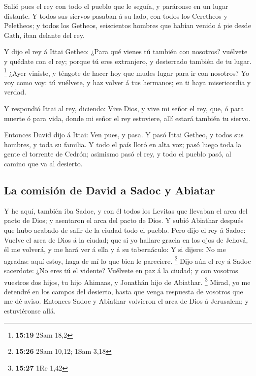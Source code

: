  Salió pues el rey con todo el pueblo que le seguía, y
paráronse en un lugar distante.  Y todos sus siervos
pasaban á su lado, con todos los Ceretheos y Peletheos; y todos los
Getheos, seiscientos hombres que habían venido á pie desde Gath, iban
delante del rey.

 Y dijo el rey á Ittai Getheo: ¿Para qué vienes tú también
con nosotros? vuélvete y quédate con el rey; porque tú eres extranjero,
y desterrado también de tu lugar. \footnote{\textbf{15:19} 2Sam 18,2}
 ¿Ayer viniste, y téngote de hacer hoy que mudes lugar para
ir con nosotros? Yo voy como voy: tú vuélvete, y haz volver á tus
hermanos; en ti haya misericordia y verdad.

 Y respondió Ittai al rey, diciendo: Vive Dios, y vive mi
señor el rey, que, ó para muerte ó para vida, donde mi señor el rey
estuviere, allí estará también tu siervo.

 Entonces David dijo á Ittai: Ven pues, y pasa. Y pasó
Ittai Getheo, y todos sus hombres, y toda su familia.  Y
todo el país lloró en alta voz; pasó luego toda la gente el torrente de
Cedrón; asimismo pasó el rey, y todo el pueblo pasó, al camino que va al
desierto.

\hypertarget{la-comisiuxf3n-de-david-a-sadoc-y-abiatar}{%
\subsection{La comisión de David a Sadoc y
Abiatar}\label{la-comisiuxf3n-de-david-a-sadoc-y-abiatar}}

 Y he aquí, también iba Sadoc, y con él todos los Levitas
que llevaban el arca del pacto de Dios; y asentaron el arca del pacto de
Dios. Y subió Abiathar después que hubo acabado de salir de la ciudad
todo el pueblo.  Pero dijo el rey á Sadoc: Vuelve el arca
de Dios á la ciudad; que si yo hallare gracia en los ojos de Jehová, él
me volverá, y me hará ver á ella y á su tabernáculo:  Y si
dijere: No me agradas: aquí estoy, haga de mí lo que bien le pareciere.
\footnote{\textbf{15:26} 2Sam 10,12; 1Sam 3,18}  Dijo aún
el rey á Sadoc sacerdote: ¿No eres tú el vidente? Vuélvete en paz á la
ciudad; y con vosotros vuestros dos hijos, tu hijo Ahimaas, y Jonathán
hijo de Abiathar. \footnote{\textbf{15:27} 1Re 1,42} 
Mirad, yo me detendré en los campos del desierto, hasta que venga
respuesta de vosotros que me dé aviso.  Entonces Sadoc y
Abiathar volvieron el arca de Dios á Jerusalem; y estuviéronse allá.

